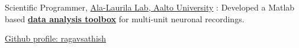 
\inlineheadsection
{Scientific Programmer, \href{http://ala-laurila.biosci.helsinki.fi/}{Ala-Laurila Lab, Aalto University} :}
{Developed a Matlab based \href{https://github.com/Schwartz-AlaLaurila-Labs/sa-labs-analysis}{\textbf{data analysis toolbox}}  for multi-unit neuronal recordings. }
\vspace{0.5em}

\inlineheadsection
  {\href{https://github.com/ragavsathish}{Github profile: ragavsathish}}
  {}
